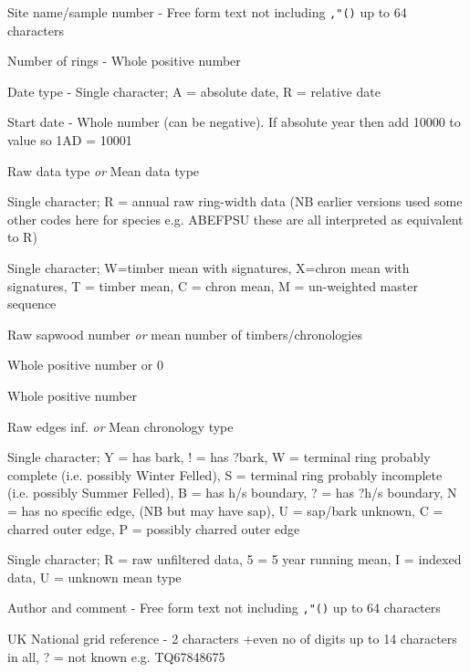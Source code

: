 \begin{enumerate*}
 \item Site name/sample number - Free form text not including \verb|,"()| up to 64 characters 
 \item Number of rings - Whole positive number 
 \item Date type - Single character; A = absolute date, R = relative date 
 \item Start date - Whole number (can be negative).  If absolute year then add 10000 to value so 1AD = 10001
 \item Raw data type \emph{or} Mean data type 
      \begin{itemize*}   
       \item Single character; R = annual raw ring-width data (NB earlier versions used some other codes here for species e.g. ABEFPSU these are all interpreted as equivalent to R) 
       \item Single character; W=timber mean with signatures, X=chron mean with signatures, T = timber mean, C = chron mean, M = un-weighted master sequence 
      \end{itemize*} 
 \item Raw sapwood number \emph{or} mean number of timbers/chronologies
      \begin{itemize*}   
       \item Whole positive number or 0 
       \item Whole positive number
      \end{itemize*} 
 \item Raw edges inf. \emph{or} Mean chronology type
      \begin{itemize*}   
       \item Single character; Y = has bark, ! = has ?bark, W = terminal ring probably complete (i.e. possibly Winter Felled), S = terminal ring probably incomplete (i.e. possibly Summer Felled), B = has h/s boundary, ? = has ?h/s boundary, N = has no specific edge, (NB but may have sap), U = sap/bark unknown, C = charred outer edge, P = possibly charred outer edge 
       \item Single character; R = raw unfiltered data, 5 = 5 year running mean, I = indexed data, U = unknown mean type 
      \end{itemize*} 
 \item Author and comment - Free form text not including \verb|,"()| up to 64 characters 
 \item UK National grid reference - 2 characters +even no of digits up to 14 characters in all, ? = not known e.g. TQ67848675

\end{enumerate*}
